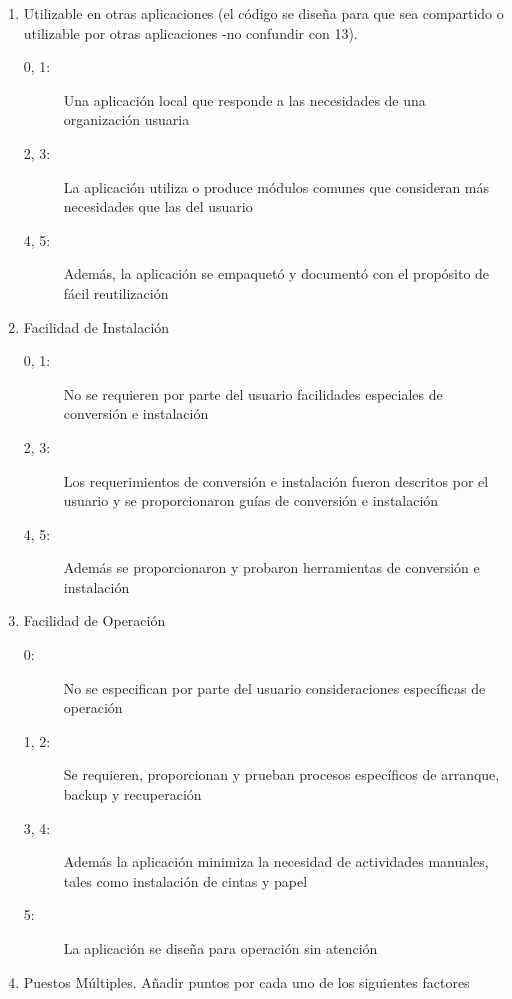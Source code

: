 \begin{enumerate}
\begin{description}
                \end{description}
            \item Utilizable en otras aplicaciones (el código se diseña para que sea compartido o utilizable por otras aplicaciones  -no confundir con 13).
                \begin{description}
                    \item[0, 1:]Una aplicación local que responde a las necesidades de una organización usuaria
                    \item[2, 3:]La aplicación utiliza o produce módulos comunes que consideran más necesidades que las del usuario
                    \item[4, 5:]Además, la aplicación se empaquetó y documentó con el propósito de fácil reutilización
                \end{description}
            \item Facilidad de Instalación
                \begin{description}
                   \item[0, 1:]No se requieren por parte del usuario facilidades especiales de conversión e instalación
                   \item[2, 3:]Los requerimientos de conversión e instalación fueron descritos por el usuario y se proporcionaron guías de conversión e instalación
                   \item[4, 5:]Además se proporcionaron y probaron herramientas de conversión e instalación
                \end{description}
            \item Facilidad de Operación
                \begin{description}
                   \item[0:]No se especifican por parte del usuario consideraciones específicas de operación
                   \item[1, 2:]Se requieren, proporcionan y prueban procesos específicos de arranque, backup y recuperación
                   \item[3, 4:]Además la aplicación minimiza la necesidad de actividades manuales, tales como instalación de cintas y papel
                   \item[5:]La aplicación se diseña para operación sin atención
                \end{description}
            \item Puestos Múltiples. Añadir puntos por cada uno de los siguientes factores

\end{enumerate}
